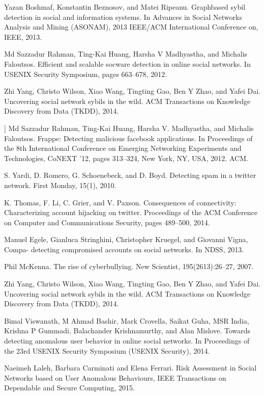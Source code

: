 \documentclass[conference]{IEEEtran}
\begin{document}
\begin{enumerate}[label={[\arabic*]}]
 \item Yazan Boshmaf, Konstantin Beznosov, and Matei Ripeanu. Graphbased sybil detection in social and information systems. In Advances in Social Networks Analysis and Mining (ASONAM), 2013 IEEE/ACM International Conference on, IEEE, 2013. 
  \item  Md Sazzadur Rahman, Ting-Kai Huang, Harsha V Madhyastha, and Michalis Faloutsos. Efficient and scalable socware detection in online social networks. In USENIX Security Symposium, pages 663–678, 2012. 
  \item  Zhi Yang, Christo Wilson, Xiao Wang, Tingting
        Gao, Ben Y Zhao, and Yafei Dai. Uncovering social
        network sybils in the wild. ACM Transactions on
        Knowledge Discovery from Data (TKDD), 2014. 
 \item ] Md Sazzadur Rahman, Ting-Kai Huang, Harsha V. Madhyastha,
and Michalis Faloutsos. Frappe: Detecting malicious facebook
applications. In Proceedings of the 8th International Conference on
Emerging Networking Experiments and Technologies, CoNEXT ’12,
pages 313–324, New York, NY, USA, 2012. ACM.
\item S. Yardi, D. Romero, G. Schoenebeck, and D. Boyd.
Detecting spam in a twitter network. First Monday,
15(1), 2010.
\item K. Thomas, F. Li, C. Grier, and V. Paxson.
Consequences of connectivity: Characterizing
account hijacking on twitter. Proceedings of the
ACM Conference on Computer and
Communications Security, pages 489–500, 2014.
 \item Manuel Egele, Gianluca Stringhini, Christopher Kruegel, and Giovanni
Vigna, Compa- detecting compromised accounts on social
networks. In NDSS, 2013.
 \item Phil McKenna. The rise of cyberbullying. New
Scientist, 195(2613):26–27, 2007.
\item Zhi Yang, Christo Wilson, Xiao Wang, Tingting
Gao, Ben Y Zhao, and Yafei Dai. Uncovering social
network sybils in the wild. ACM Transactions on
Knowledge Discovery from Data (TKDD), 2014.
\item Bimal Viswanath, M Ahmad Bashir, Mark Crovella, Saikat Guha,
MSR India, Krishna P Gummadi, Balachander Krishnamurthy, and
Alan Mislove. Towards detecting anomalous user behavior in
online social networks. In Proceedings of the 23rd USENIX Security
Symposium (USENIX Security), 2014. 

\item  Naeimeh Laleh, Barbara Carminati and Elena Ferrari. Risk Assessment in Social Networks based on
User Anomalous Behaviours, IEEE Transactions on Dependable and Secure Computing, 2015.


\end{enumerate}
\end{document}
